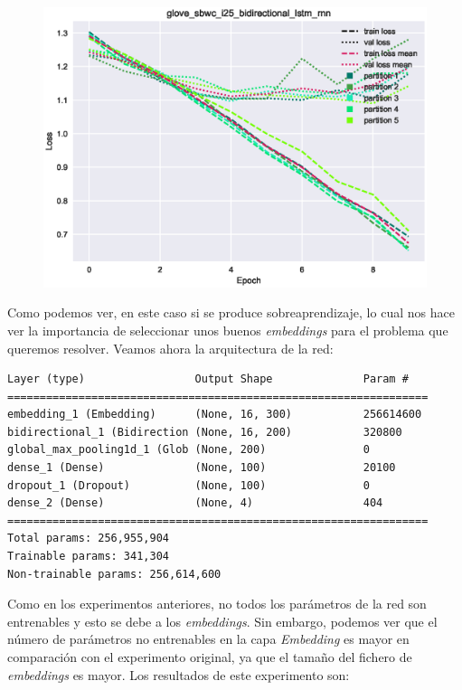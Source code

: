\documentclass[11pt]{article}
\begin{document}
\begin{figure}[H]
\includegraphics[width=\linewidth]{images/loss/glove_sbwc_i25_bidirectional_lstm_rnn-1554400692.eps}
\end{figure}

Como podemos ver, en este caso si se produce sobreaprendizaje, lo cual nos hace ver la importancia de seleccionar unos buenos \textit{embeddings} para el problema que queremos resolver. Veamos ahora la arquitectura de la red:

\begin{verbatim}
Layer (type)                 Output Shape              Param #   
=================================================================
embedding_1 (Embedding)      (None, 16, 300)           256614600 
bidirectional_1 (Bidirection (None, 16, 200)           320800    
global_max_pooling1d_1 (Glob (None, 200)               0         
dense_1 (Dense)              (None, 100)               20100     
dropout_1 (Dropout)          (None, 100)               0         
dense_2 (Dense)              (None, 4)                 404       
=================================================================
Total params: 256,955,904
Trainable params: 341,304
Non-trainable params: 256,614,600
\end{verbatim}

Como en los experimentos anteriores, no todos los parámetros de la red son entrenables y esto se debe a los \textit{embeddings}. Sin embargo, podemos ver que el número de parámetros no entrenables en la capa \textit{Embedding} es mayor en comparación con el experimento original, ya que el tamaño del fichero de \textit{embeddings} es mayor. Los resultados de este experimento son: 
\end{document}
